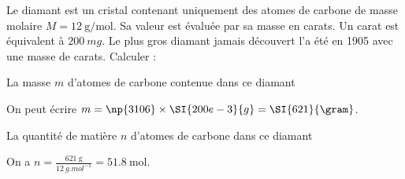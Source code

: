 \minusMedskip


\hauteurLargeurCadreReponse		{7mm}{4cm}
\initialisationEntrainement


\debutEntrainement

Le diamant est un cristal contenant uniquement des atomes de carbone de masse molaire $M=\SI{12}{\gram\per\mol}$. Sa valeur est évaluée par sa masse en carats. Un carat est équivalent à $\SI{200}{mg}$. Le plus gros diamant jamais découvert l'a été en 1905 avec une masse de  carats. Calculer : 


\begin{enonce}
La masse $m$ d'atomes de carbone contenue dans ce diamant
\end{enonce}


\begin{corrige}
On peut écrire $m=\np{3106}\times\SI{200e-3}{g}=\SI{621}{\gram}$.
\end{corrige}


\begin{enonce}
La quantité de matière $n$ d'atomes de carbone dans ce diamant
\end{enonce}


\begin{corrige}
On a $n=\frac{\SI{621}{\gram}}{\SI{12}{g.mol^{-1}}}=\SI{51,8}{\mole}$.
\end{corrige}

